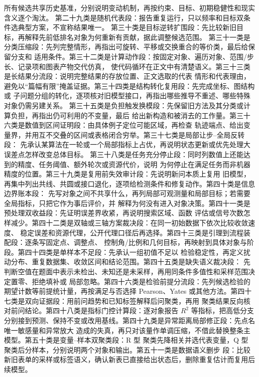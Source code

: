所有候选共享历史基准，分别说明变动机制，再按约束、目标、初期稳健性和现实含义逐个淘汰。
第二十九类是随机代表段：报告重复运行，只以频率和目标双条件选典型方案，不宣称结果唯一。
第三十类是目标逆转扩围段：先比较新旧目标，再解释先前低排名对象为何重新有贡献，据此调整候选范围。
第三十一类是分类压缩段：先列完整情形，再指出可旋转、平移或交换重合的等价类，最后给保留分支和
适用条件。第三十二类是计算动作段：按固定对象、遍历对象、范围/步长、记录项和图表产物交代仿真，
使代码循环在正文中有清楚语义。第三十三类是长结果分流段：说明完整结果的存放位置、正文选取的代表
情形和代表理由，避免以“篇幅有限”掩盖证据。第三十四类是结构转化复用段：先完成坐标、图结构或
子问题分组的转化，逐项核对旧模型接口，再指出哪些推导不重述、哪些特殊对象仍需另建关系。
第三十五类是负担触发换模段：先保留旧方法及其分类或计算负担，再指出仍可利用的不变量，最后
给出新构造和被消去的工作量。第三十六类是数值到区间证明段：由具体例子定位可能区域，再检查
轨迹端点、给出变量界，并用互不交叠的区间或表格闭合穷举。第三十七类是局部让步--全局反转段：
先承认某算法在一轮或一个局部指标上占优，再说明状态更新或优先处理大误差点怎样改变总体目标。
第三十八类是任务充分停止段：同时列数值上还能达到的精度、任务阈值、额外轮次或资源代价，说明
为何停止在满足任务而非机器精度的位置。第三十九类是复用前失效审计段：先说明新问本质上复用
旧模型，再集中列出共线、共圆或接口退化，逐项给检测条件和修复动作。第四十类是信息边界账本段：
先写对象之间不共享什么，再列局部可观测量和局部目标；若需要全局指标，只把它作为事后评价，并
解释为何没有进入对象决策。第四十一类是预处理双收益段：先证明误差界收紧，再说明搜索区域、函数
评估或信号次数怎样减少。第四十二类是双轴或三轴方案裁决段：在同一初始数据下依次比较收敛速度、
稳定误差和资源代理，公开代理口径后再选择。第四十三类是引理到流程装配段：逐条写固定点、调整点、
控制角/比例和几何目标，再映射到具体对象与阶段。第四十四类是单样本不足段：先承认一组初值不足以
检验稳定性，再定义扰动分布、重复数据集、收敛区间和结论范围。第四十五类是缺失语义裁决段：
先判断空值在题面中表示未检出、未知还是未采样，再用同条件多值性和采样范围决定置零、拒绝填补或
局部忽略。第四十六类是检验前提分流段：先列候选检验的期望计数等前提统计量，再按满足与否选择
Pearson、Yates 或其他方法。第四十七类是双向证据段：用前问趋势和已知标签解释后问聚类，再用
聚类结果反向核对前问结论。第四十八类是指标门控计算段：逐对象报告 $R^2$ 等指标，把高低分支
分别接到预测、保持不变或改用基线。第四十九类是异常距离局部修正段：先点名唯一敏感量和异常放大
造成的失真，再只对该量作单调压缩，不借此替换整条主模型。第五十类是变量--样本双聚类段：R 型
聚类先降相关并选代表变量，Q 型聚类后分样本，分别说明两个对象和输出。第五十一类是数据语义删步
段：比较新旧表单的采样或标签语义，确认新表已直接给出状态后，删除重复估计而复用后续模型。
